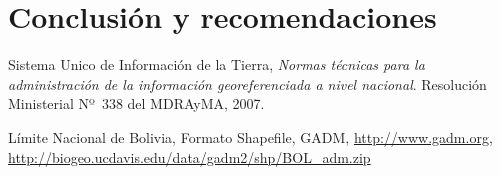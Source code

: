 \documentclass[letterpaper]{article}
\begin{document}
\section{Conclusión y recomendaciones}



\begin{thebibliography}{99}

  Sistema Unico de Información de la Tierra,
  \emph{Normas técnicas para la administración de la información georeferenciada a nivel nacional}.
  Resolución Ministerial Nº~338 del MDRAyMA,
  2007.

  Límite Nacional de Bolivia,
  Formato Shapefile,
  GADM,
  \url{http://www.gadm.org},
  \url{http://biogeo.ucdavis.edu/data/gadm2/shp/BOL_adm.zip}

\end{thebibliography}
\end{document}

